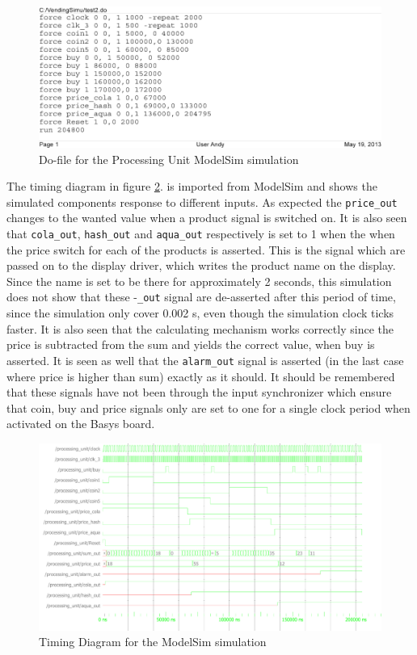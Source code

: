 \begin{figure}[h!]
\centering
\includegraphics[scale=0.8]{figs/dofile.pdf}
\caption{Do-file for the Processing Unit ModelSim simulation}
\label{fig:dofile}
\end{figure}

The timing diagram in figure \ref{fig:simu}. is imported from ModelSim and shows the simulated components response to different inputs. As expected the \texttt{price\_out} changes to the wanted value when a product signal is switched on. It is also seen that \texttt{cola\_out}, \texttt{hash\_out} and \texttt{aqua\_out} respectively is set to 1 when the when the price switch for each of the products is asserted. This is the signal which are passed on to the display driver, which writes the product name on the display. Since the name is set to be there for approximately 2 seconds, this simulation does not show that these -\texttt{\_out} signal are de-asserted after this period of time, since the simulation only cover 0.002 s, even though the simulation clock ticks faster. It is also seen that the calculating mechanism works correctly since the price is subtracted from the sum and yields the correct value, when buy is asserted. It is seen as well that the \texttt{alarm\_out} signal is asserted (in the last case where price is higher than sum) exactly as it should. It should be remembered that these signals have not been through the input synchronizer which ensure that coin, buy and price signals only are set to one for a single clock period when activated on the Basys board.

\begin{figure}[h!]
\centering
\includegraphics[scale=0.8]{figs/processingunit.pdf}
\caption{Timing Diagram for the ModelSim simulation}
\label{fig:simu}
\end{figure}

